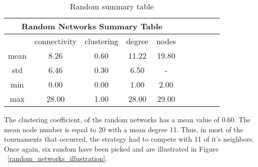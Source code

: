 \begin{table}[!hbtp]
	\centering
	\begin{adjustbox}{width=0.5\textwidth}
		\small
		\begin{tabular}{cccccccccc}
				\toprule
			\multicolumn{5}{|c|}{Random Networks Summary Table}                       \\ \hline
			     & connectivity & clustering & degree & nodes                  \\ \hline
			mean & 8.26         & 0.60       & 11.22  & 19.80                  \\ \hline
			std  & 6.46         & 0.30       & 6.50   & \multicolumn{1}{c}{-} \\ \hline
			min  & 0.00         & 0.00       & 1.00   & 2.00                   \\ \hline
			max  & 28.00        & 1.00       & 28.00  & 29.00                  \\ \bottomrule
		\end{tabular}
	\end{adjustbox}
	\caption{Random summary table}
	\label{table:binomial-summary-table}
\end{table}

The clustering coefficient, of the random networks has a mean value of 0.60. The
mean node number is equal to 20 with a mean degree 11. Thus, in most of the
tournaments that occurred, the strategy had to compete with 11 of it's neighbors.
Once again, six random have been picked and are illustrated in Figure ~\ref{random_networks_illustration}.

